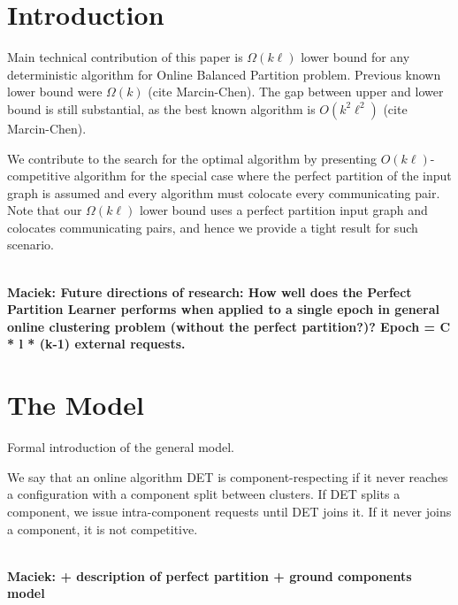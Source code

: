\documentclass[conference]{IEEEtran}
\newcommand\maciek[1]{\color{brown}\textbf{\\ Maciek: #1}\color{black}}
\begin{document}
\section{Introduction}

Main technical contribution of this paper is $\Omega(k\ell)$ lower bound for any deterministic algorithm for Online Balanced Partition problem.
Previous known lower bound were $\Omega(k)$ (cite Marcin-Chen).
The gap between upper and lower bound is still substantial, as the best known algorithm is $O(k^2\ell^2)$ (cite Marcin-Chen).

We contribute to the search for the optimal algorithm by presenting $O(k\ell)$-competitive algorithm for the special case where the perfect partition of the input graph is assumed and every algorithm must colocate every communicating pair.
Note that our $\Omega(k\ell)$ lower bound uses a perfect partition input graph and colocates communicating pairs, and hence we provide a tight result for such scenario.

\maciek{Future directions of research: How well does the Perfect Partition Learner performs when applied to a single epoch in general online clustering problem (without the perfect partition?)? Epoch = C * l * (k-1) external requests.}

\section{The Model}

Formal introduction of the general model.

 We say that an online algorithm DET is component-respecting if it never reaches a configuration with a component split between clusters.
 If DET splits a component, we issue intra-component requests until DET joins it.
 If it never joins a component, it is not competitive.

 \maciek{+ description of perfect partition + ground components model}




\appendix


	
\end{document}
